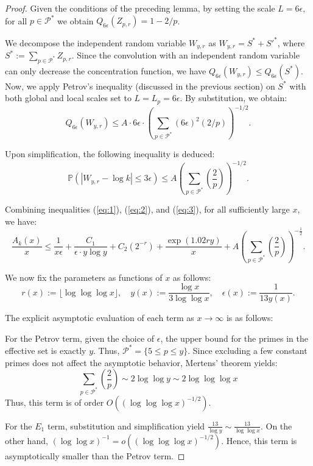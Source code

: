 \documentclass[10pt,a4paper]{amsart}
\begin{document}
\begin{proof}
Given the conditions of the preceding lemma, by setting the scale $L = 6\epsilon$, for all $p \in \mathcal{P}^*$ we obtain $Q_{6\epsilon}(Z_{p,r}) = 1 - 2/p$.

We decompose the independent random variable $W_{y,r}$ as $W_{y,r} = S^* + S'^*$, where $S^* := \sum_{p \in \mathcal{P}^*} Z_{p,r}$. Since the convolution with an independent random variable can only decrease the concentration function, we have $Q_{6\epsilon}(W_{y,r}) \leq Q_{6\epsilon}(S^*)$. Now, we apply Petrov's inequality (discussed in the previous section) on $S^*$ with both global and local scales set to $L = L_p = 6\epsilon$. By substitution, we obtain:
\[ Q_{6\epsilon}(W_{y,r}) \leq A \cdot 6\epsilon \cdot \left( \sum_{p \in \mathcal{P}^*} (6\epsilon)^2 (2/p) \right)^{-1/2}. \]

Upon simplification, the following inequality is deduced:
\begin{equation}
\mathbb{P}(|W_{y,r} - \log k| \leq 3\epsilon) \leq A \left( \sum_{p \in \mathcal{P}^*} \left(\frac{2}{p}\right) \right)^{-1/2}. \label{eq:3}
\end{equation}

Combining inequalities (\ref{eq:1}), (\ref{eq:2}), and (\ref{eq:3}), for all sufficiently large $x$, we have:
\[ \frac{A_k(x)}{x} \leq \frac{1}{x\epsilon} + \frac{C_1}{\epsilon \cdot y \log y} + C_2(2^{-r}) + \frac{\exp(1.02ry)}{x} + A \left( \sum_{p \in \mathcal{P}^*} \left(\frac{2}{p}\right) \right)^{-\frac{1}{2}}. \]

We now fix the parameters as functions of $x$ as follows:
\[ r(x) := \lfloor \log \log \log x \rfloor, \quad y(x) := \frac{\log x}{3 \log \log x}, \quad \epsilon(x) := \frac{1}{13y(x)}. \]

The explicit asymptotic evaluation of each term as $x \to \infty$ is as follows:

For the Petrov term, given the choice of $\epsilon$, the upper bound for the primes in the effective set is exactly $y$. Thus, $\mathcal{P}^* = \{5 \leq p \leq y\}$. Since excluding a few constant primes does not affect the asymptotic behavior, Mertens' theorem yields:
\[ \sum_{p \in \mathcal{P}^*} \left(\frac{2}{p}\right) \sim 2 \log \log y \sim 2 \log \log \log x \]
Thus, this term is of order $O((\log \log \log x)^{-1/2})$.

For the $E_1$ term, substitution and simplification yield $\frac{13}{\log y} \sim \frac{13}{\log \log x}$. On the other hand, $(\log \log x)^{-1} = o((\log \log \log x)^{-1/2})$. Hence, this term is asymptotically smaller than the Petrov term.


\end{proof}
\end{document}
